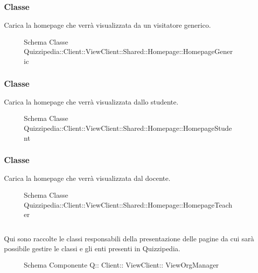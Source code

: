 \subsubsection{Classe }
Carica la homepage che verrà visualizzata da un visitatore generico.
\begin{figure}[H]
\centering
\noindent{}
\caption[Schema Classe HomepageGeneric]{Schema Classe Quizzipedia::Client::ViewClient::Shared::Homepage::HomepageGeneric}
\end{figure}
\subsubsection{Classe }
Carica la homepage che verrà visualizzata dallo studente.
\begin{figure}[H]
\centering
\noindent{}
\caption[Schema Classe HomepageStudent]{Schema Classe Quizzipedia::Client::ViewClient::Shared::Homepage::HomepageStudent}
\end{figure}
\subsubsection{Classe }
Carica la homepage che verrà visualizzata dal docente.
\begin{figure}[H]
\centering
\noindent{}
\caption[Schema Classe HomepageTeacher]{Schema Classe Quizzipedia::Client::ViewClient::Shared::Homepage::HomepageTeacher}
\end{figure}
\subsection{}
Qui sono raccolte le classi responsabili della presentazione delle pagine da cui sarà possibile gestire le classi e gli enti presenti in Quizzipedia.
\begin{figure}[H]
\centering
\noindent{}
\caption[Schema Componente Quizzipedia::Client::ViewClient::ViewOrgManager]{Schema Componente Q:: Client:: ViewClient:: ViewOrgManager}
\end{figure}
